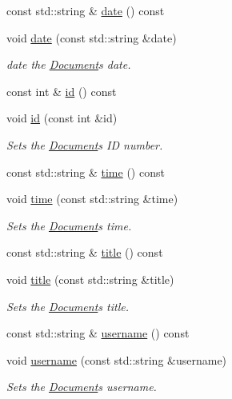 \begin{DoxyCompactItemize}
const std\+::string \& \hyperlink{class_document_a1185d78c1c5c5ea69572c20d1c8e552a}{date} () const 
\item 
void \hyperlink{class_document_a7e1af2cd6cb30c92b5f434863898019e}{date} (const std\+::string \&date)
\begin{DoxyCompactList}\small\item\em date the \hyperlink{class_document}{Document}\textquotesingle{}s date. \end{DoxyCompactList}\item 
const int \& \hyperlink{class_document_acda3a6caa3bc958024aa795cde6c7081}{id} () const 
\item 
void \hyperlink{class_document_ab538b0d75fd467eea80868917c63fbe5}{id} (const int \&id)
\begin{DoxyCompactList}\small\item\em Sets the \hyperlink{class_document}{Document}\textquotesingle{}s I\+D number. \end{DoxyCompactList}\item 
const std\+::string \& \hyperlink{class_document_afda77c47efd90655ba5bb2ab8bf9ba00}{time} () const 
\item 
void \hyperlink{class_document_a351642ea8074b80657d34a034797e53c}{time} (const std\+::string \&time)
\begin{DoxyCompactList}\small\item\em Sets the \hyperlink{class_document}{Document}\textquotesingle{}s time. \end{DoxyCompactList}\item 
const std\+::string \& \hyperlink{class_document_a4aac8266d0fea88e39ee390159130787}{title} () const 
\item 
void \hyperlink{class_document_ae586532a45e61a77afd0c0cfe95089ab}{title} (const std\+::string \&title)
\begin{DoxyCompactList}\small\item\em Sets the \hyperlink{class_document}{Document}\textquotesingle{}s title. \end{DoxyCompactList}\item 
const std\+::string \& \hyperlink{class_document_a52990ba26536e2e3a08593444e0ccdf3}{username} () const 
\item 
void \hyperlink{class_document_a24faf5e067badd65b55330535dec8c6a}{username} (const std\+::string \&username)
\begin{DoxyCompactList}\small\item\em Sets the \hyperlink{class_document}{Document}\textquotesingle{}s username. \end{DoxyCompactList}\end{DoxyCompactItemize}
